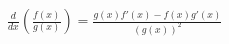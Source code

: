 \documentclass[preview]{standalone}
\begin{document}
\begin{center}
\( \frac{d}{dx}(\frac{f(x)}{g(x)}) = \frac{g(x)f'(x) - f(x)g'(x)}{(g(x))^2} \)
\end{center}
\end{document}
